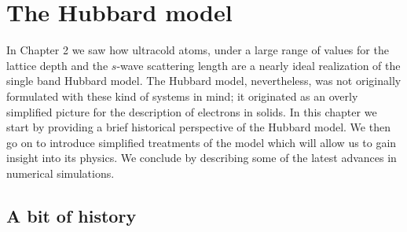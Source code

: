  
\chapter{The Hubbard model}
\label{chap:hubbardmodel}

In Chapter 2 we saw how ultracold atoms, under a large range of values for the
lattice depth and the $s$-wave scattering length are a nearly ideal realization
of the single band Hubbard model.   The Hubbard model, nevertheless, was not
originally formulated with these kind of systems in mind; it originated as an
overly simplified picture for the description of electrons in solids.   In this
chapter we start by providing a brief historical perspective of the Hubbard
model.  We then go on to introduce simplified treatments of the model which
will allow us to gain insight into its physics. We conclude by describing some
of the latest advances in numerical simulations. 

\section{A bit of history}


%

